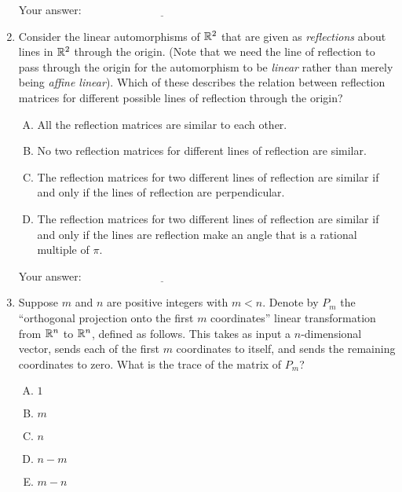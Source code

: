 \documentclass[10pt]{amsart}
\begin{document}
\begin{enumerate}
  \vspace{0.1in}
  Your answer: $\underline{\qquad\qquad\qquad\qquad\qquad\qquad\qquad}$
  \vspace{0.1in}

\item Consider the linear automorphisms of $\mathbb{R}^2$ that are given as
  {\em reflections} about lines in $\mathbb{R}^2$ through the origin. (Note
  that we need the line of reflection to pass through the origin for
  the automorphism to be {\em linear} rather than merely being {\em
    affine linear}). Which of these describes the relation between
  reflection matrices for different possible lines of reflection
  through the origin?

  \begin{enumerate}[(A)]
  \item All the reflection matrices are similar to each other.
  \item No two reflection matrices for different lines of reflection are similar.
  \item The reflection matrices for two different lines of reflection
    are similar if and only if the lines of reflection are
    perpendicular.
  \item The reflection matrices for two different lines of reflection
    are similar if and only if the lines are reflection make an angle
    that is a rational multiple of $\pi$.
  \end{enumerate}

  \vspace{0.1in}
  Your answer: $\underline{\qquad\qquad\qquad\qquad\qquad\qquad\qquad}$
  \vspace{0.1in}

\item Suppose $m$ and $n$ are positive integers with $m < n$. Denote
  by $P_m$ the ``orthogonal projection onto the first $m$
  coordinates'' linear transformation from $\mathbb{R}^n$ to $\mathbb{R}^n$, defined
  as follows. This takes as input a $n$-dimensional vector, sends
  each of the first $m$ coordinates to itself, and sends the remaining
  coordinates to zero. What is the trace of the matrix of $P_m$?

  \begin{enumerate}[(A)]
  \item $1$
  \item $m$
  \item $n$
  \item $n - m$
  \item $m - n$
  \end{enumerate}


\end{enumerate}
\end{document}
